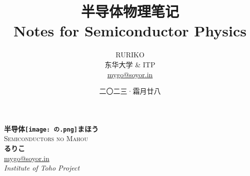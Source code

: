 \documentclass{report}
\title{\Huge\textbf{半导体物理笔记}\\ \vspace{1ex}\LARGE Notes for Semiconductor Physics}
\author{\Large RURIKO\vspace{2ex} \\ \vspace{2ex}东华大学 \& ITP \\ \href{mailto:mygo@soyor.in}{mygo@soyor.in}}
\date{二〇二三·霜月廿八}
\numberwithin{equation}{section}
\begin{document}
\begin{titlepage}
\begin{center}
  {\Huge\bfseries 半导体\texttt{[image: の.png]}まほう}\\[2ex]
  \textsc{\LARGE Semiconductors no Mahou}\\[6.5ex]
  {\large\bfseries るりこ}           \\
  \vspace{4ex}
  \href{mailto:mygo@soyor.in}{mygo@soyor.in}                    \\[5pt]
  \textit{Institute of Toho Project}                \\[0.8cm]
  \begin{figure}[H]
      \centering
\iffalse
{} %

\begin{tikzpicture}[x=0.75pt,y=0.75pt,yscale=-1,xscale=1]


\end{tikzpicture}
\end{figure}
\end{center}
\end{titlepage}
\end{document}
